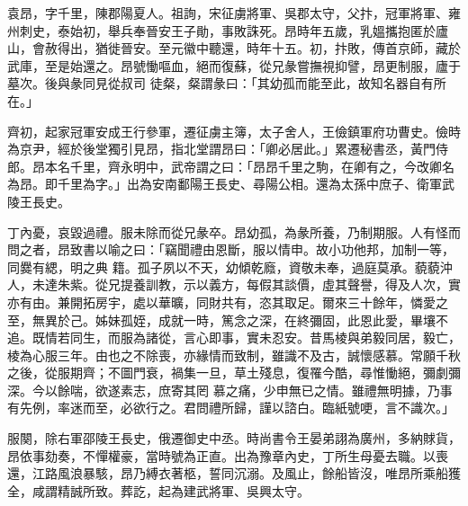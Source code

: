 
\begin{pinyinscope}

 袁昂，字千里，陳郡陽夏人。祖詢，宋征虜將軍、吳郡太守，父抃，冠軍將軍、雍州刺史，泰始初，舉兵奉晉安王子勛，事敗誅死。昂時年五歲，乳媼攜抱匿於廬山，會赦得出，猶徙晉安。至元徽中聽還，時年十五。初，抃敗，傳首京師，藏於武庫，至是始還之。昂號慟嘔血，絕而復蘇，從兄彖嘗撫視抑譬，昂更制服，廬于墓次。後與彖同見從叔司
 徒粲，粲謂彖曰：「其幼孤而能至此，故知名器自有所在。」



 齊初，起家冠軍安成王行參軍，遷征虜主簿，太子舍人，王儉鎮軍府功曹史。儉時為京尹，經於後堂獨引見昂，指北堂謂昂曰：「卿必居此。」累遷秘書丞，黃門侍郎。昂本名千里，齊永明中，武帝謂之曰：「昂昂千里之駒，在卿有之，今改卿名為昂。即千里為字。」出為安南鄱陽王長史、尋陽公相。還為太孫中庶子、衛軍武陵王長史。



 丁內憂，哀毀過禮。服未除而從兄彖卒。昂幼孤，為彖所養，乃制期服。人有怪而問之者，昂致書以喻之曰：「竊聞禮由恩斷，服以情申。故小功他邦，加制一等，同爨有緦，明之典
 籍。孤子夙以不天，幼傾乾廕，資敬未奉，過庭莫承。藐藐沖人，未達朱紫。從兄提養訓教，示以義方，每假其談價，虛其聲譽，得及人次，實亦有由。兼開拓房宇，處以華曠，同財共有，恣其取足。爾來三十餘年，憐愛之至，無異於己。姊妹孤姪，成就一時，篤念之深，在終彌固，此恩此愛，畢壤不追。既情若同生，而服為諸從，言心即事，實未忍安。昔馬棱與弟毅同居，毅亡，棱為心服三年。由也之不除喪，亦緣情而致制，雖識不及古，誠懷感慕。常願千秋之後，從服期齊；不圖門衰，禍集一旦，草土殘息，復罹今酷，尋惟慟絕，彌劇彌深。今以餘喘，欲遂素志，庶寄其罔
 慕之痛，少申無已之情。雖禮無明據，乃事有先例，率迷而至，必欲行之。君問禮所歸，謹以諮白。臨紙號哽，言不識次。」



 服闋，除右軍邵陵王長史，俄遷御史中丞。時尚書令王晏弟詡為廣州，多納賕貨，昂依事劾奏，不憚權豪，當時號為正直。出為豫章內史，丁所生母憂去職。以喪還，江路風浪暴駭，昂乃縛衣著柩，誓同沉溺。及風止，餘船皆沒，唯昂所乘船獲全，咸謂精誠所致。葬訖，起為建武將軍、吳興太守。




\end{pinyinscope}
